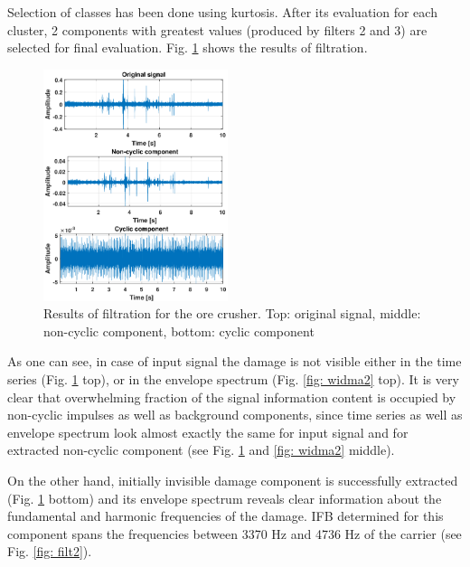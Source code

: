 \documentclass[journal]{IEEEtran}
\begin{document}
Selection of classes has been done using kurtosis. After its evaluation for each cluster, 2 components with greatest values (produced by filters 2 and 3) are selected for final evaluation. Fig. \ref{fig: out2} shows the results of filtration.

\begin{figure}[!ht]
\centering
\includegraphics[width = 0.48\textwidth]{figs3/out.png}
\caption{Results of filtration for the ore crusher. Top: original signal, middle: non-cyclic component, bottom: cyclic component}
\label{fig: out2}
\end{figure}

As one can see, in case of input signal the damage is not visible either in the time series (Fig. \ref{fig: out2} top), or in the envelope spectrum (Fig. \ref{fig: widma2} top). It is very clear that overwhelming fraction of the signal information content is occupied by non-cyclic impulses as well as background components, since time series as well as envelope spectrum look almost exactly the same for input signal and for extracted non-cyclic component (see Fig. \ref{fig: out2} and \ref{fig: widma2} middle).

On the other hand, initially invisible damage component is successfully extracted (Fig. \ref{fig: out2} bottom) and its envelope spectrum reveals clear information about the fundamental and harmonic frequencies of the damage. IFB determined for this component spans the frequencies between 3370 Hz and 4736 Hz of the carrier (see Fig. \ref{fig: filt2}).
\end{document}
